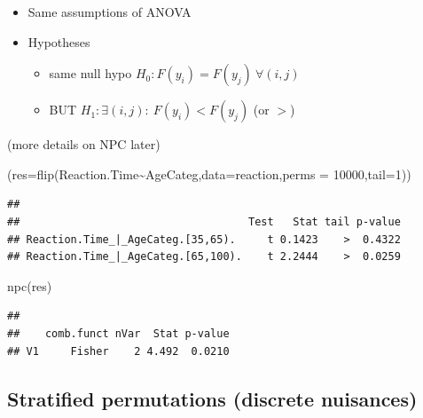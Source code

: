 \documentclass[
]{article}
\newenvironment{Shaded}{\begin{snugshade}}{\end{snugshade}}
\newcommand{\AttributeTok}[1]{\textcolor[rgb]{0.77,0.63,0.00}{#1}}
\newcommand{\DecValTok}[1]{\textcolor[rgb]{0.00,0.00,0.81}{#1}}
\newcommand{\FunctionTok}[1]{\textcolor[rgb]{0.00,0.00,0.00}{#1}}
\newcommand{\NormalTok}[1]{#1}
\newcommand{\SpecialCharTok}[1]{\textcolor[rgb]{0.00,0.00,0.00}{#1}}
\providecommand{\tightlist}{%
  \setlength{\itemsep}{0pt}\setlength{\parskip}{0pt}}
\begin{document}
\begin{itemize}
\tightlist
\item
  Same assumptions of ANOVA\\
\item
  Hypotheses

  \begin{itemize}
  \tightlist
  \item
    same null hypo \(H_0: F(y_i)=F(y_j)\ \forall (i,j)\)\\
  \item
    BUT \(H_1: \exists (i,j): \ F(y_i)< F(y_j)\) (or \(>\))
  \end{itemize}
\end{itemize}

(more details on NPC later)

\begin{Shaded}
\begin{Highlighting}[]
\NormalTok{(}\AttributeTok{res=}\FunctionTok{flip}\NormalTok{(Reaction.Time}\SpecialCharTok{\textasciitilde{}}\NormalTok{AgeCateg,}\AttributeTok{data=}\NormalTok{reaction,}\AttributeTok{perms =} \DecValTok{10000}\NormalTok{,}\AttributeTok{tail=}\DecValTok{1}\NormalTok{))}
\end{Highlighting}
\end{Shaded}

\begin{verbatim}
## 
##                                    Test   Stat tail p-value
## Reaction.Time_|_AgeCateg.[35,65).     t 0.1423    >  0.4322
## Reaction.Time_|_AgeCateg.[65,100).    t 2.2444    >  0.0259
\end{verbatim}

\begin{Shaded}
\begin{Highlighting}[]
\FunctionTok{npc}\NormalTok{(res)}
\end{Highlighting}
\end{Shaded}

\begin{verbatim}
## 
##    comb.funct nVar  Stat p-value
## V1     Fisher    2 4.492  0.0210
\end{verbatim}

\hypertarget{stratified-permutations-discrete-nuisances}{%
\subsection{Stratified permutations (discrete
nuisances)}\label{stratified-permutations-discrete-nuisances}}
\end{document}
